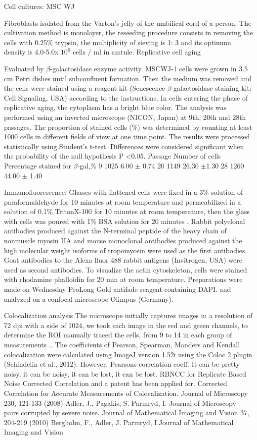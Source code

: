 \documentclass[english,authoryear]{elsarticle}
\begin{document}
Cell cultures: MSC WJ

Fibroblasts isolated from the Varton's jelly of the umbilical cord of a person.
The cultivation method is monolayer, the reseeding procedure consists in removing the cells with 0.25\% trypsin, the multiplicity of sieving is 1: 3 and its optimum density is 4.0-5.0x $10 ^ 6$ cells / ml in amtule.
Replicative cell aging

Evaluated by $\beta$-galactosidase enzyme activity. MSCWJ-1 cells were grown in 3.5 cm Petri dishes until subconfluent formation.
Then the medium was removed and the cells were stained using a reagent kit (Senescence $\beta$-galactosidase staining kit; Cell Signaling, USA) according to the instructions. In cells entering the phase of replicative aging, the cytoplasm has a bright blue color. The analysis was performed using an inverted microscope (NICON, Japan) at 9th, 20th and 28th passages. The proportion of stained cells (\%) was determined by counting at least 1000 cells in different fields of view at one time point. The results were processed statistically using Student's t-test. Differences were considered significant when the probability of the null hypothesis P <0.05.
Passage Number of cells Percentage stained for $\beta$-gal,\%
9 1025 6.00 $\pm$ 0.74
20 1149 26.30 $\pm$1.30
28 1260 44.00 $\pm$ 1.40

Immunofluorescence:
Glasses with flattened cells were fixed in a 3\% solution of paraformaldehyde for 10 minutes at room temperature and permeabilized in a solution of 0.1\% TritonX-100 for 10 minutes at room temperature, then the glass with cells was poured with 1\% BSA solution for 20 minutes . Rabbit polyclonal antibodies produced against the N-terminal peptide of the heavy chain of nonmuscle myosin IIA and mouse monoclonal antibodies produced against the high molecular weight isoforms of tropomyosin were used as the first antibodies. Goat antibodies to the Alexa fluor 488 rabbit antigens (Invitrogen, USA) were used as second antibodies. To visualize the actin cytoskeleton, cells were stained with rhodamine phalloidin for 20 min at room temperature. Preparations were made on Wednesday ProLong Gold antifade reagent containing DAPI. and analyzed on a confocal microscope Olimpus (Germany).

Colocalization analysis
The microscope initially captures images in a resolution of 72 dpi with a side of 1024, we took each image in the red and green channels, to determine the ROI manually traced the cells, from 9 to 14 in each group of measurements ..
The coefficients of Pearson, Spearman, Manders and Kendall colocalization were calculated using ImageJ version 1.52i using the Coloc 2 plugin (Schindelin et al., 2012).
However, Pearsons correlation coeff. It can be pretty noisy, it can be noisy, it can be lost, it can be lost. RBNCC for Replicate Based Noise Corrected Correlation and a patent has been applied for. Corrected Correlation for Accurate Measurements of Colocalization. Journal of Microscopy 230, 121-133 (2008) Adler, J., Pagakis, S.  Parmryd, I. Journal of Microscopy pairs corrupted by severe noise.
Journal of Mathematical Imaging and Vision 37, 204-219 (2010) Bergholm, F., Adler, J.  Parmryd, I.Journal of Mathematical Imaging and Vision
\end{document}
